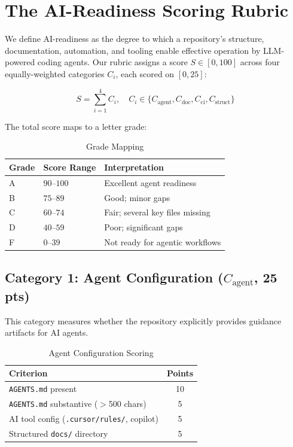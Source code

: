 \documentclass[11pt,twocolumn]{article}
\begin{document}
\section{The AI-Readiness Scoring Rubric}
\label{sec:rubric}

We define AI-readiness as the degree to which a repository's structure,
documentation, automation, and tooling enable effective operation by
LLM-powered coding agents. Our rubric assigns a score $S \in [0, 100]$
across four equally-weighted categories $C_i$, each scored on $[0, 25]$:

\begin{equation}
S = \sum_{i=1}^{4} C_i, \quad C_i \in \{C_{\text{agent}}, C_{\text{doc}}, C_{\text{ci}}, C_{\text{struct}}\}
\end{equation}

\noindent The total score maps to a letter grade:

\begin{table}[H]
\centering
\caption{Grade Mapping}
\label{tab:grades}
\begin{tabular}{@{}lll@{}}
\toprule
\textbf{Grade} & \textbf{Score Range} & \textbf{Interpretation} \\
\midrule
A & $90$--$100$ & Excellent agent readiness \\
B & $75$--$89$ & Good; minor gaps \\
C & $60$--$74$ & Fair; several key files missing \\
D & $40$--$59$ & Poor; significant gaps \\
F & $0$--$39$ & Not ready for agentic workflows \\
\bottomrule
\end{tabular}
\end{table}

\subsection{Category 1: Agent Configuration ($C_{\text{agent}}$, 25 pts)}
\label{sec:cat1}

This category measures whether the repository explicitly provides
guidance artifacts for AI agents.

\begin{table}[H]
\centering
\caption{Agent Configuration Scoring}
\label{tab:cat1}
\begin{tabular}{@{}lc@{}}
\toprule
\textbf{Criterion} & \textbf{Points} \\
\midrule
\texttt{AGENTS.md} present & 10 \\
\texttt{AGENTS.md} substantive ($>$500 chars) & 5 \\
AI tool config (\texttt{.cursor/rules/}, copilot) & 5 \\
Structured \texttt{docs/} directory & 5 \\
\bottomrule
\end{tabular}
\end{table}
\end{document}
